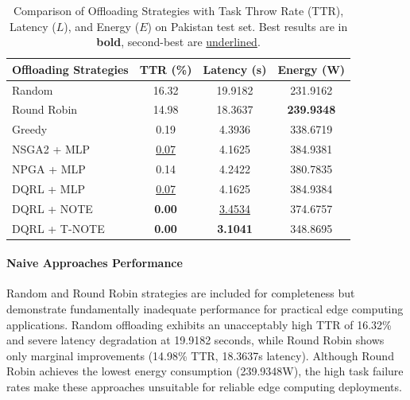 \documentclass[preprint,12pt]{elsarticle}
\begin{document}
\begin{table}[htbp]
\centering
\caption{Comparison of Offloading Strategies with Task Throw Rate (TTR), Latency (\(L\)), and Energy (\(E\)) on Pakistan test set.
Best results are in \textbf{bold}, second-best are \underline{underlined}.}
\label{tab:results_comparison}
\begin{tabular}{lccc}
\toprule
\textbf{Offloading Strategies} & \textbf{TTR (\%)} & \textbf{Latency (s)} & \textbf{Energy (W)} \\
\midrule
Random 
 & 16.32 
 & 19.9182 
 & 231.9162 \\
 
Round Robin 
 & 14.98 
 & 18.3637 
 & \textbf{239.9348} \\
 
Greedy 
 & 0.19 
 & 4.3936 
 & 338.6719 \\
 
NSGA2 + MLP 
 & \underline{0.07} 
 & 4.1625 
 & 384.9381 \\
 
NPGA + MLP 
 & 0.14 
 & 4.2422 
 & 380.7835 \\
 
DQRL + MLP 
 & \underline{0.07} 
 & 4.1625 
 & 384.9384 \\
 
DQRL + NOTE 
 & \textbf{0.00} 
 & \underline{3.4534} 
 & 374.6757 \\
 
DQRL + T-NOTE 
 & \textbf{0.00} 
 & \textbf{3.1041} 
 & 348.8695 \\
 
\bottomrule
\end{tabular}
\end{table}

\paragraph{Naive Approaches Performance}

Random and Round Robin strategies are included for completeness but demonstrate fundamentally inadequate performance for practical edge computing applications. Random offloading exhibits an unacceptably high TTR of 16.32\% and severe latency degradation at 19.9182 seconds, while Round Robin shows only marginal improvements (14.98\% TTR, 18.3637s latency). Although Round Robin achieves the lowest energy consumption (239.9348W), the high task failure rates make these approaches unsuitable for reliable edge computing deployments.
\end{document}
